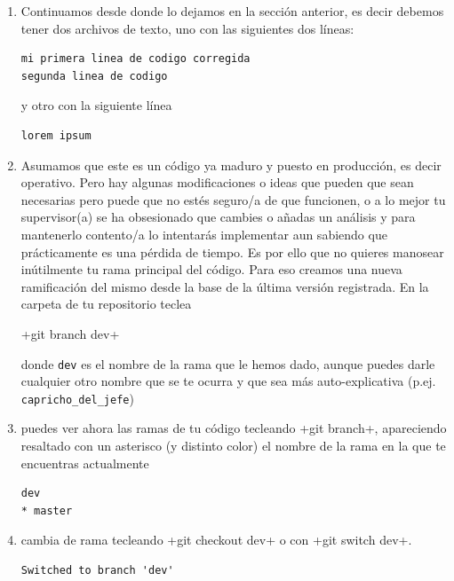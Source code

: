 \documentclass[a5paper,10pt]{article}
\begin{document}
    \begin{enumerate}
     \item Continuamos desde donde lo dejamos en la sección anterior, es decir debemos tener dos archivos de texto, uno con las siguientes dos líneas:
     \begin{lstlisting}[style=custom]
mi primera linea de codigo corregida
segunda linea de codigo
     \end{lstlisting}
     
     y otro con la siguiente línea
     
    \begin{lstlisting}[style=custom]
lorem ipsum
    \end{lstlisting}
    
    \item Asumamos que este es un código ya maduro y puesto en producción, es decir operativo. Pero hay algunas modificaciones o ideas que pueden que sean necesarias pero puede que no estés seguro/a de que funcionen, o a lo mejor tu supervisor(a) se ha obsesionado que cambies o añadas un análisis y para mantenerlo contento/a lo intentarás implementar aun sabiendo que prácticamente es una pérdida de tiempo. Es por ello que no quieres manosear inútilmente tu rama principal del código. Para eso creamos una nueva ramificación del mismo desde la base de la última versión registrada. En la carpeta de tu repositorio teclea
    
    \cverb+git branch dev+
    
    donde \verb+dev+ es el nombre de la rama que le hemos dado, aunque puedes darle cualquier otro nombre que se te ocurra y que sea más auto-explicativa (p.ej. \verb+capricho_del_jefe+)
    
    \item puedes ver ahora las ramas de tu código tecleando \cverb+git branch+, apareciendo resaltado con un asterisco (y distinto color) el nombre de la rama en la que te encuentras actualmente
    
    \begin{lstlisting}[style=custom]
  dev
* master
    \end{lstlisting}

    \item cambia de rama tecleando \cverb+git checkout dev+ o con \cverb+git switch dev+.
    
    \begin{lstlisting}[style=custom]
Switched to branch 'dev'
    \end{lstlisting}
    

\end{enumerate}
\end{document}

